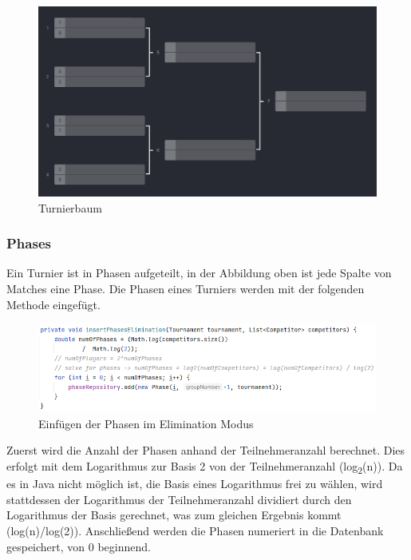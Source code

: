 \begin{figure}[H]
    \includegraphics[scale=0.5]{pics/backend/elimination/elimination_tree.png}
    \caption{Turnierbaum\cite{implementation-execution-1}}
\end{figure}

\subsubsection{Phases}

Ein Turnier ist in Phasen aufgeteilt, in der Abbildung oben ist jede Spalte von Matches eine Phase. Die Phasen eines Turniers werden mit der folgenden Methode eingefügt.

\begin{figure}[H]
    \includegraphics[scale=0.7]{pics/backend/elimination/elimination_insertPhases.png}
    \caption{Einfügen der Phasen im Elimination Modus}
\end{figure}

Zuerst wird die Anzahl der Phasen anhand der Teilnehmeranzahl berechnet. Dies erfolgt mit dem Logarithmus zur Basis 2 von der Teilnehmeranzahl (log\textsubscript{2}(n)). 
Da es in Java nicht möglich ist, die Basis eines Logarithmus frei zu wählen, wird stattdessen der Logarithmus der Teilnehmeranzahl dividiert durch den 
Logarithmus der Basis gerechnet, was zum gleichen Ergebnis kommt (log(n)/log(2)). Anschließend werden die Phasen numeriert in die Datenbank gespeichert, von 0 beginnend.

